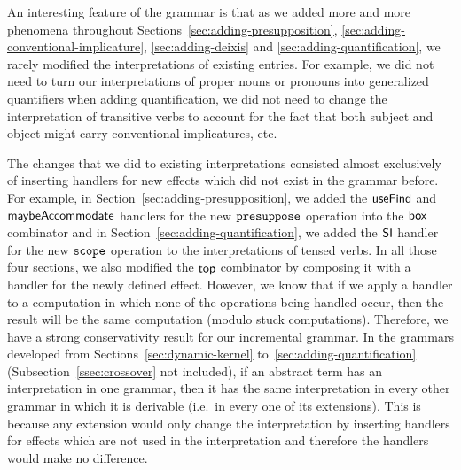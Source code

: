 An interesting feature of the grammar is that as we added more and more
phenomena throughout Sections~\ref{sec:adding-presupposition},
\ref{sec:adding-conventional-implicature}, \ref{sec:adding-deixis} and
\ref{sec:adding-quantification}, we rarely modified the interpretations of
existing entries. For example, we did not need to turn our interpretations
of proper nouns or pronouns into generalized quantifiers when adding
quantification, we did not need to change the interpretation of transitive
verbs to account for the fact that both subject and object might carry
conventional implicatures, etc.

The changes that we did to existing interpretations consisted almost
exclusively of inserting handlers for new effects which did not exist in
the grammar before. For example, in
Section~\ref{sec:adding-presupposition}, we added the $\textsf{useFind}$ and
$\textsf{maybeAccommodate}$ handlers for the new $\mathtt{presuppose}$ operation into
the $\textsf{box}$ combinator and in Section~\ref{sec:adding-quantification}, we
added the $\textsf{SI}$ handler for the new $\mathtt{scope}$ operation to the
interpretations of tensed verbs. In all those four sections, we also
modified the $\textsf{top}$ combinator by composing it with a handler for the newly
defined effect. However, we know that if we apply a handler to a
computation in which none of the operations being handled occur, then the
result will be the same computation (modulo stuck computations). Therefore,
we have a strong conservativity result for our incremental grammar. In the
grammars developed from Sections~\ref{sec:dynamic-kernel}
to~\ref{sec:adding-quantification} (Subsection~\ref{ssec:crossover} not
included), if an abstract term has an interpretation in one grammar, then
it has the same interpretation in every other grammar in which it is
derivable (i.e.\ in every one of its extensions). This is because any
extension would only change the interpretation by inserting handlers for
effects which are not used in the interpretation and therefore the handlers
would make no difference.
